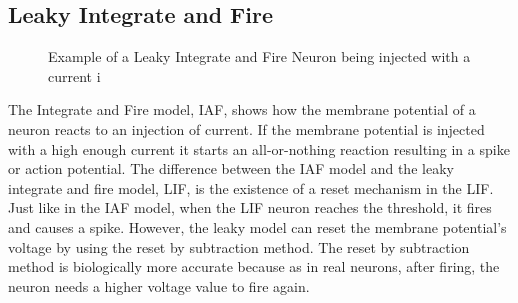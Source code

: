 
\subsection{Leaky Integrate and Fire}

\begin{figure}[h]
	\begin{center}
	
	\end{center}
	\caption{Example of a Leaky Integrate and Fire Neuron being injected with a current {i}}
\end{figure}

The Integrate and Fire model, IAF, shows how the membrane potential of a neuron reacts to an injection of current. If the membrane potential is injected with a high enough current it starts an all-or-nothing reaction resulting in a spike or action potential. The difference between the IAF model and the leaky integrate and fire model, LIF, is the existence of a reset mechanism in the LIF. Just like in the IAF model, when the LIF neuron reaches the threshold, it fires and causes a spike. However, the leaky model can reset the membrane potential's voltage by using the reset by subtraction method. The reset by subtraction method is biologically more accurate because as in real neurons, after firing, the neuron needs a higher voltage value to fire again.







